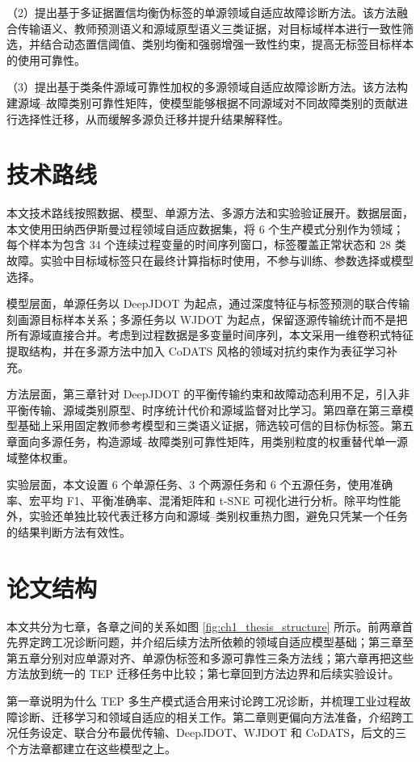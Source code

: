 \documentclass{seuthesis-2022}
\begin{document}
（2）提出基于多证据置信均衡伪标签的单源领域自适应故障诊断方法。该方法融合传输语义、教师预测语义和源域原型语义三类证据，对目标域样本进行一致性筛选，并结合动态置信阈值、类别均衡和强弱增强一致性约束，提高无标签目标样本的使用可靠性。

（3）提出基于类条件源域可靠性加权的多源领域自适应故障诊断方法。该方法构建源域--故障类别可靠性矩阵，使模型能够根据不同源域对不同故障类别的贡献进行选择性迁移，从而缓解多源负迁移并提升结果解释性。

\section{技术路线}

本文技术路线按照数据、模型、单源方法、多源方法和实验验证展开。数据层面，本文使用田纳西伊斯曼过程领域自适应数据集，将 6 个生产模式分别作为领域；每个样本为包含 34 个连续过程变量的时间序列窗口，标签覆盖正常状态和 28 类故障。实验中目标域标签只在最终计算指标时使用，不参与训练、参数选择或模型选择。

模型层面，单源任务以 DeepJDOT 为起点，通过深度特征与标签预测的联合传输刻画源目标样本关系；多源任务以 WJDOT 为起点，保留逐源传输统计而不是把所有源域直接合并。考虑到过程数据是多变量时间序列，本文采用一维卷积式特征提取结构，并在多源方法中加入 CoDATS 风格的领域对抗约束作为表征学习补充。

方法层面，第三章针对 DeepJDOT 的平衡传输约束和故障动态利用不足，引入非平衡传输、源域类别原型、时序统计代价和源域监督对比学习。第四章在第三章模型基础上采用固定教师参考模型和三类语义证据，筛选较可信的目标伪标签。第五章面向多源任务，构造源域--故障类别可靠性矩阵，用类别粒度的权重替代单一源域整体权重。

实验层面，本文设置 6 个单源任务、3 个两源任务和 6 个五源任务，使用准确率、宏平均 F1、平衡准确率、混淆矩阵和 t-SNE 可视化进行分析。除平均性能外，实验还单独比较代表迁移方向和源域--类别权重热力图，避免只凭某一个任务的结果判断方法有效性。

\section{论文结构}

本文共分为七章，各章之间的关系如图 \ref{fig:ch1_thesis_structure} 所示。前两章首先界定跨工况诊断问题，并介绍后续方法所依赖的领域自适应模型基础；第三章至第五章分别对应单源对齐、单源伪标签和多源可靠性三条方法线；第六章再把这些方法放到统一的 TEP 迁移任务中比较；第七章回到方法边界和后续实验设计。

第一章说明为什么 TEP 多生产模式适合用来讨论跨工况诊断，并梳理工业过程故障诊断、迁移学习和领域自适应的相关工作。第二章则更偏向方法准备，介绍跨工况任务设定、联合分布最优传输、DeepJDOT、WJDOT 和 CoDATS，后文的三个方法章都建立在这些模型之上。
\end{document}
